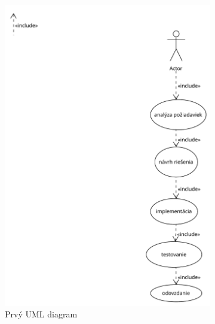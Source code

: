 \documentclass[10pt,twocolumn,twoside,slovak,a4paper]{article}
\begin{document}
\begin{figure}[h!]
    \centering
    \begin{subfigure}[t]{0.48\columnwidth}
        \centering
        \includegraphics[width=\linewidth]{diagram1.pdf}
        \caption{Prvý UML diagram}
        \label{fig:diagram1}
    \end{subfigure}
    \hfill
    \begin{subfigure}[t]{0.48\columnwidth}
        \centering

\end{subfigure}
\end{figure}
\end{document}
